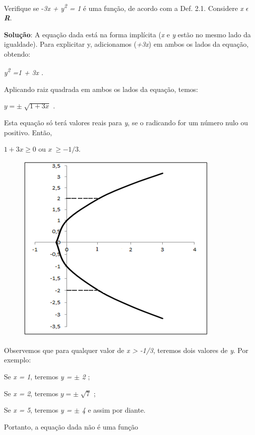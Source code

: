 \begin{texemplo}
Verifique se  -\textit{3x + y\textsuperscript{2} = 1} é uma função, de acordo com a Def. 2.1. Considere \textit{x $ \epsilon $  \textbf{R}}.

\textbf{Solução}: A equação dada está na forma implícita (\textit{x} e \textit{y} estão no mesmo lado da igualdade). Para explicitar y, adicionamos (\textit{+3x}) em ambos os lados da equação, obtendo:

\textit{y\textsuperscript{2} =1 + 3x .}

Aplicando raiz quadrada em ambos os lados da equação, temos:

 \( y= \pm \sqrt[]{1+3x} \)   .

Esta equação só terá valores reais para \textit{y}, se o radicando for um número nulo ou positivo. Então,

 \( 1+ 3x  \geq  0  \)      ou      \( x~  \geq  -1/3. \) 

\begin{figure}[H]
	\begin{Center}
		\includegraphics[width=3.9in,height=3.67in]{capitulos/funcao_do_primeiro_grau/media/image7.png}
	\end{Center}
\end{figure}

Observemos que para qualquer valor de \textit{x > -1/3}, teremos dois valores de \textit{y}. Por exemplo:

\tab Se \textit{x = 1}, teremos \textit{y = $ \pm $  2}   ;  

\tab Se \textit{x = 2}, teremos   \( y= \pm \sqrt[]{7} \)    ;

\tab Se \textit{x = 5}, teremos \textit{y = $ \pm $  4 }e assim por diante.   

Portanto, a equação dada não é uma função  \qedsymbol{}
\end{texemplo}

